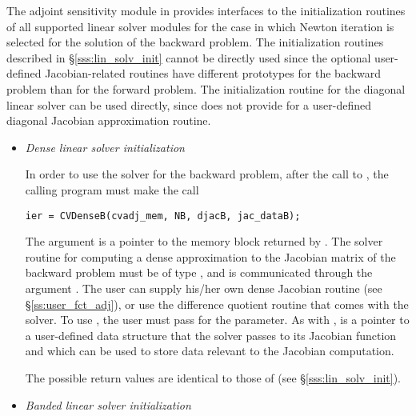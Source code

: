 The adjoint sensitivity module in {\cvodes} provides interfaces to the initialization
routines of all supported linear solver modules for the case in which Newton
iteration is selected for the solution of the backward problem. The initialization
routines described in \S\ref{sss:lin_solv_init} cannot be directly used since the
optional user-defined Jacobian-related routines have different prototypes for the
backward problem than for the forward problem. The initialization routine
 for the diagonal linear solver can be used directly, since {\cvdiag}
does not provide for a user-defined diagonal Jacobian approximation routine. 

\begin{itemize}

\item {\em Dense linear solver initialization}

  In order to use the {\cvdense} solver for the backward problem, after the call to 
  , the calling program must make the call
\begin{verbatim}
ier = CVDenseB(cvadj_mem, NB, djacB, jac_dataB);
\end{verbatim}
  The argument  is a pointer to the memory block
  returned by . The {\cvdense} solver routine for computing a
  dense approximation to the Jacobian matrix of the backward problem must be
  of type , and is communicated through the argument
  . The user can supply his/her own dense Jacobian routine
  (see \S\ref{ss:user_fct_adj}), or use the difference quotient routine 
   that comes with the {\cvdense} solver.  To use 
  , the user must pass  for the  parameter.
  As with ,  is a pointer to a user-defined 
  data structure that the {\cvdense} solver passes to its Jacobian function
  and which can be used to store data relevant to the Jacobian computation.
  
  The possible return values  are identical to those of 
  (see \S\ref{sss:lin_solv_init}).

\item {\em Banded linear solver initialization}


\end{itemize}
